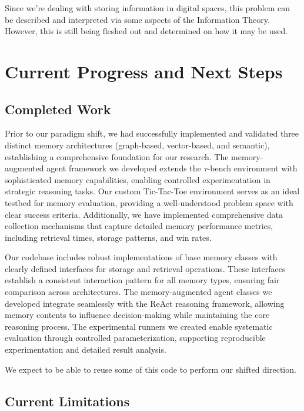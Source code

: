 \documentclass{article}
\begin{document}
Since we're dealing with storing information in digital spaces, this problem can be described and interpreted via some aspects of the Information Theory. However, this is still being fleshed out and determined on how it may be used.

\section{Current Progress and Next Steps}

\subsection{Completed Work}

Prior to our paradigm shift, we had successfully implemented and validated three distinct memory architectures (graph-based, vector-based, and semantic), establishing a comprehensive foundation for our research. The memory-augmented agent framework we developed extends the $\tau$-bench environment with sophisticated memory capabilities, enabling controlled experimentation in strategic reasoning tasks. Our custom Tic-Tac-Toe environment serves as an ideal testbed for memory evaluation, providing a well-understood problem space with clear success criteria. Additionally, we have implemented comprehensive data collection mechanisms that capture detailed memory performance metrics, including retrieval times, storage patterns, and win rates.

Our codebase includes robust implementations of base memory classes with clearly defined interfaces for storage and retrieval operations. These interfaces establish a consistent interaction pattern for all memory types, ensuring fair comparison across architectures. The memory-augmented agent classes we developed integrate seamlessly with the ReAct reasoning framework, allowing memory contents to influence decision-making while maintaining the core reasoning process. The experimental runners we created enable systematic evaluation through controlled parameterization, supporting reproducible experimentation and detailed result analysis.

We expect to be able to reuse some of this code to perform our shifted direction.

\subsection{Current Limitations}
\end{document}
